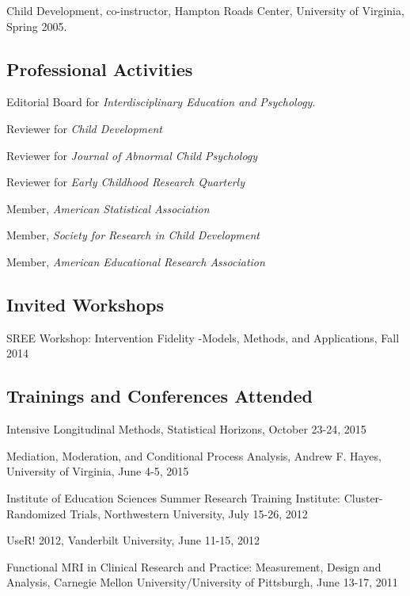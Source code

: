 \documentclass[11pt,]{article}
\begin{document}
Child Development, co-instructor, Hampton Roads Center, University of
Virginia, Spring 2005.

\hypertarget{professional-activities}{%
\subsection{Professional Activities}\label{professional-activities}}

Editorial Board for \emph{Interdisciplinary Education and Psychology}.

Reviewer for \emph{Child Development}

Reviewer for \emph{Journal of Abnormal Child Psychology}

Reviewer for \emph{Early Childhood Research Quarterly}

Member, \emph{American Statistical Association }

Member, \emph{Society for Research in Child Development}

Member, \emph{American Educational Research Association}

\hypertarget{invited-workshops}{%
\subsection{Invited Workshops}\label{invited-workshops}}

SREE Workshop: Intervention Fidelity -Models, Methods, and Applications,
Fall 2014

\hypertarget{trainings-and-conferences-attended}{%
\subsection{Trainings and Conferences
Attended}\label{trainings-and-conferences-attended}}

Intensive Longitudinal Methods, Statistical Horizons, October 23-24,
2015

Mediation, Moderation, and Conditional Process Analysis, Andrew F.
Hayes, University of Virginia, June 4-5, 2015

Institute of Education Sciences Summer Research Training Institute:
Cluster-Randomized Trials, Northwestern University, July 15-26, 2012

UseR! 2012, Vanderbilt University, June 11-15, 2012

Functional MRI in Clinical Research and Practice: Measurement, Design
and Analysis, Carnegie Mellon University/University of Pittsburgh, June
13-17, 2011
\end{document}
